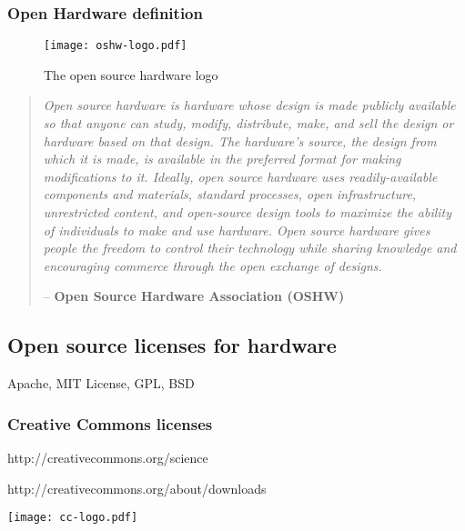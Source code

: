 \subsubsection{Open Hardware definition} %

\begin{figure}[]
    \begin{center}
        \texttt{[image: oshw-logo.pdf]}
    \end{center}
    \caption{The open source hardware logo}
    \label{fig:ohw-logo}
\end{figure}

\begin{quotation}
  \emph{Open source hardware is hardware whose design is made publicly available so that anyone can study, modify, distribute, make, and sell the design or hardware based on that design. The hardware’s source, the design from which it is made, is available in the preferred format for making modifications to it. Ideally, open source hardware uses readily-available components and materials, standard processes, open infrastructure, unrestricted content, and open-source design tools to maximize the ability of individuals to make and use hardware. Open source hardware gives people the freedom to control their technology while sharing knowledge and encouraging commerce through the open exchange of designs.}

  -- \textbf{Open Source Hardware Association (OSHW)}
\end{quotation}


\subsection{Open source licenses for hardware} %



Apache, MIT License, GPL, BSD
\subsubsection{Creative Commons licenses} %


http://creativecommons.org/science

http://creativecommons.org/about/downloads
\begin{NFfigure}
    \begin{center}
        \texttt{[image: cc-logo.pdf]}
    \end{center}
    \caption{Creative Commons logo}
    \label{fig:cc-logo}
\end{NFfigure}

